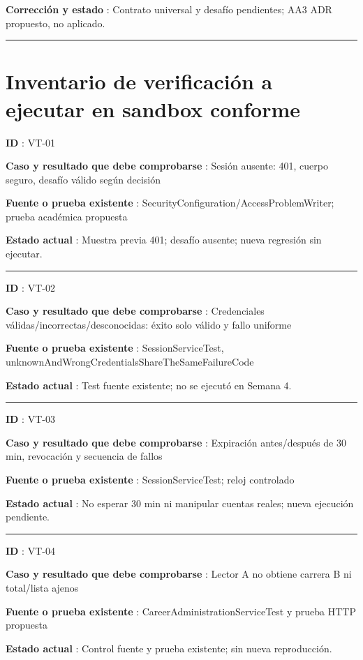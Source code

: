 \documentclass[12pt,a4paper]{report}
\begin{document}
\textbf{Corrección y estado }: Contrato universal y desafío pendientes;
AA3 ADR propuesto, no aplicado.

\medskip\hrule\medskip

\section{Inventario de verificación a ejecutar en sandbox
conforme}\label{ACD4-semana-4-anexo1-inventario-de-verificaciuxf3n-a-ejecutar-en-sandbox-conforme}

\textbf{ID }: VT-01

\textbf{Caso y resultado que debe comprobarse }: Sesión ausente: 401,
cuerpo seguro, desafío válido según decisión

\textbf{Fuente o prueba existente
}: SecurityConfiguration/AccessProblemWriter; prueba académica propuesta

\textbf{Estado actual }: Muestra previa 401; desafío ausente; nueva
regresión sin ejecutar.

\medskip\hrule\medskip

\textbf{ID }: VT-02

\textbf{Caso y resultado que debe comprobarse }: Credenciales
válidas/incorrectas/desconocidas: éxito solo válido y fallo uniforme

\textbf{Fuente o prueba existente }: SessionServiceTest,
unknownAndWrongCredentialsShareTheSameFailureCode

\textbf{Estado actual }: Test fuente existente; no se ejecutó en Semana
4.

\medskip\hrule\medskip

\textbf{ID }: VT-03

\textbf{Caso y resultado que debe comprobarse }: Expiración
antes/después de 30 min, revocación y secuencia de fallos

\textbf{Fuente o prueba existente }: SessionServiceTest; reloj
controlado

\textbf{Estado actual }: No esperar 30 min ni manipular cuentas reales;
nueva ejecución pendiente.

\medskip\hrule\medskip

\textbf{ID }: VT-04

\textbf{Caso y resultado que debe comprobarse }: Lector A no obtiene
carrera B ni total/lista ajenos

\textbf{Fuente o prueba existente }: CareerAdministrationServiceTest y
prueba HTTP propuesta

\textbf{Estado actual }: Control fuente y prueba existente; sin nueva
reproducción.
\end{document}
